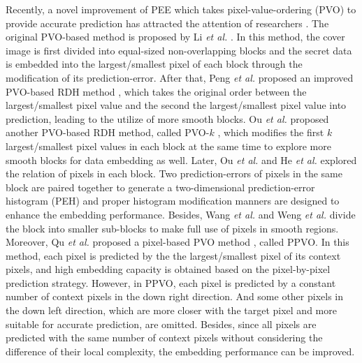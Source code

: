 \documentclass[review,3p,10pt,sort&compress]{elsarticle}
\begin{document}
Recently, a novel improvement of PEE which takes pixel-value-ordering (PVO) to provide accurate prediction has attracted the attention of researchers \cite{
Li2013PVO,
Peng2014IPVO,
Ou2014PVOk,
Qu2015PPVO,
Xiang2015A,
Bo2016Improved,
Weng2016Reversible,
Weng2017Optimal,
He2018Reversible,
Kim2018Skewed}.
The original PVO-based method is proposed by Li \emph{et al.} \cite{Li2013PVO}. In this method, the cover image is first divided into equal-sized non-overlapping blocks and the secret data is embedded into the largest/smallest pixel of each block through the modification of its prediction-error.
After that, Peng \emph{et al.} proposed an improved PVO-based RDH method \cite{Peng2014IPVO}, which takes the original order between the largest/smallest pixel value and the second the largest/smallest pixel value into prediction, leading to the utilize of more smooth blocks. Ou \emph{et al.} proposed another PVO-based RDH method, called PVO-$k$ \cite{Ou2014PVOk}, which modifies the first $k$ largest/smallest pixel values in each block at the same time to explore more smooth blocks for data embedding as well.
Later, Ou \emph{et al.} \cite{Bo2016Improved} and He \emph{et al.} \cite{He2018Reversible} explored the relation of pixels in each block. Two prediction-errors of pixels in the same block are paired together to generate a two-dimensional prediction-error histogram (PEH) and proper histogram modification manners are designed to enhance the embedding performance.
Besides, Wang \emph{et al.} \cite{Xiang2015A} and Weng \emph{et al.} \cite{Weng2016Reversible} divide the block into smaller sub-blocks to make full use of pixels in smooth regions.
Moreover, Qu \emph{et al.} proposed a pixel-based PVO method \cite{Qu2015PPVO}, called PPVO. In this method, each pixel is predicted by the the largest/smallest pixel of its context pixels, and high embedding capacity is obtained based on the pixel-by-pixel prediction strategy.
However, in PPVO, each pixel is predicted by a constant number of context pixels in the down right direction. And some other pixels in the down left direction, which are more closer with the target pixel and more suitable for accurate prediction, are omitted. Besides, since all pixels are predicted with the same number of context pixels without considering the difference of their local complexity, the embedding performance can be improved.
\end{document}
